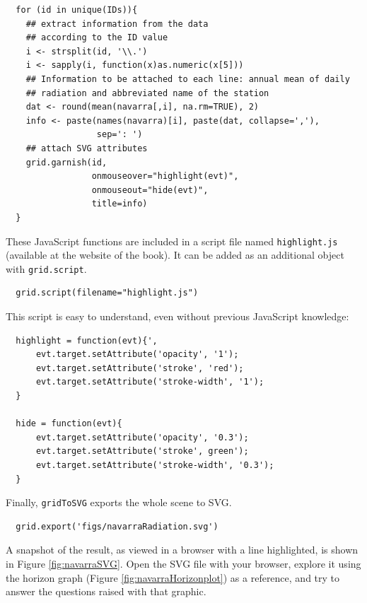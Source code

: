 \documentclass[smallroyalvopaper]{memoir}
\begin{document}

\lstset{language=r,label= ,caption= ,captionpos=b,numbers=none}
\begin{lstlisting}
  for (id in unique(IDs)){
    ## extract information from the data
    ## according to the ID value
    i <- strsplit(id, '\\.')
    i <- sapply(i, function(x)as.numeric(x[5]))
    ## Information to be attached to each line: annual mean of daily
    ## radiation and abbreviated name of the station
    dat <- round(mean(navarra[,i], na.rm=TRUE), 2)
    info <- paste(names(navarra)[i], paste(dat, collapse=','),
                  sep=': ')
    ## attach SVG attributes
    grid.garnish(id,
                 onmouseover="highlight(evt)",
                 onmouseout="hide(evt)",
                 title=info)
  }
\end{lstlisting}

These JavaScript functions are included in a script file named
\texttt{highlight.js} (available at the website of the book). It can be
added as an additional object with \texttt{grid.script}.


\lstset{language=r,label= ,caption= ,captionpos=b,numbers=none}
\begin{lstlisting}
  grid.script(filename="highlight.js")
\end{lstlisting}

This script is easy to understand, even without previous
JavaScript knowledge:
\begin{verbatim}
  highlight = function(evt){',
      evt.target.setAttribute('opacity', '1');
      evt.target.setAttribute('stroke', 'red');
      evt.target.setAttribute('stroke-width', '1');
  }
  
  hide = function(evt){
      evt.target.setAttribute('opacity', '0.3');
      evt.target.setAttribute('stroke', green');
      evt.target.setAttribute('stroke-width', '0.3');
  }
\end{verbatim}

Finally, \texttt{gridToSVG} exports the whole scene to SVG. 

\lstset{language=r,label= ,caption= ,captionpos=b,numbers=none}
\begin{lstlisting}
  grid.export('figs/navarraRadiation.svg')
\end{lstlisting}

A snapshot of the result, as viewed in a browser with a line
highlighted, is shown in Figure \ref{fig:navarraSVG}. Open the SVG
file with your browser, explore it using the horizon graph (Figure
\ref{fig:navarraHorizonplot}) as a reference, and try to answer the
questions raised with that graphic.
\end{document}
